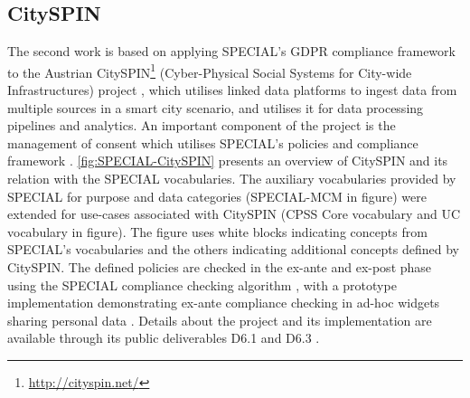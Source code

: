 

\subsection*{CitySPIN}
The second work is based on applying SPECIAL's GDPR compliance framework to the Austrian CitySPIN\footnote{\url{http://cityspin.net/}} (Cyber-Physical Social Systems for City-wide Infrastructures) project \cite{fernandez_user_2019}, which utilises linked data platforms to ingest data from multiple sources in a smart city scenario, and utilises it for data processing pipelines and analytics. An important component of the project is the management of consent which utilises SPECIAL's policies \cite{bonatti_special_2018-1,bonatti_special_2018-2} and compliance framework \cite{kirrane_scalable_2018}.
\autoref{fig:SPECIAL-CitySPIN} presents an overview of CitySPIN and its relation with the SPECIAL vocabularies. The auxiliary vocabularies provided by SPECIAL for purpose and data categories (SPECIAL-MCM in figure) were extended for use-cases associated with CitySPIN (CPSS Core vocabulary and UC vocabulary in figure).
The figure uses white blocks indicating concepts from SPECIAL's vocabularies and the others indicating additional concepts defined by CitySPIN.
The defined policies are checked in the ex-ante and ex-post phase using the SPECIAL compliance checking algorithm \cite{bonatti_fast_2018,bonatti_richer_2019}, with a prototype implementation demonstrating ex-ante compliance checking in ad-hoc widgets sharing personal data \cite{fernandez_privacy-aware_2019}. Details about the project and its implementation are available through its public deliverables D6.1 \cite{noauthor_d6.1_2018} and D6.3 \cite{noauthor_d6.3_2019}.
